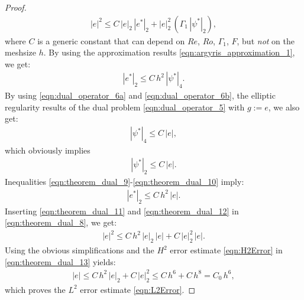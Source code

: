 \begin{proof}
\begin{eqnarray}
|e|^2
\leq C \, | e |_2 \, |e^* |_2
+ | e |_2^2 \, 
\left(
\Gamma_1 \, | \psi^* |_2
\right) ,
\label{eqn:theorem_dual_8}
\end{eqnarray}
where $C$ is a generic constant that can depend on $Re$, $Ro$, $\Gamma_1$, $F$, but \emph{not} on the meshsize $h$.
By using the approximation results \eqref{eqn:argyris_approximation_1}, we get:
\begin{eqnarray}
|e^* |_2
\leq C \, h^2 \, | \psi^* |_4 .
\label{eqn:theorem_dual_9}
\end{eqnarray}
By using \eqref{eqn:dual_operator_6a} and \eqref{eqn:dual_operator_6b}, the elliptic regularity results of the dual problem \eqref{eqn:dual_operator_5} with $g := e$, we also get:
\begin{eqnarray}
| \psi^* |_4
\leq C \, | e | ,
\label{eqn:theorem_dual_10}
\end{eqnarray}
which obviously implies
\begin{eqnarray}
| \psi^* |_2
\leq C \, | e | .
\label{eqn:theorem_dual_11}
\end{eqnarray}
Inequalities \eqref{eqn:theorem_dual_9}-\eqref{eqn:theorem_dual_10} imply:
\begin{eqnarray}
|e^* |_2
\leq C \, h^2 \, | e | .
\label{eqn:theorem_dual_12}
\end{eqnarray}
Inserting \eqref{eqn:theorem_dual_11} and \eqref{eqn:theorem_dual_12}  in \eqref{eqn:theorem_dual_8}, we get:
\begin{eqnarray}
|e|^2
\leq C \, h^2 \, | e |_2 \, | e |
+ C \, | e |_2^2 \, | e | .
\label{eqn:theorem_dual_13}
\end{eqnarray}
Using the obvious simplifications and the $H^2$ error estimate \eqref{eqn:H2Error} in \eqref{eqn:theorem_dual_13} yields:
\begin{eqnarray}
|e|
\leq C \, h^2 \, | e |_2
+ C \, | e |_2^2
\leq C \, h^6 + C \, h^8
= C_0 \, h^6 ,
\label{eqn:theorem_dual_14}
\end{eqnarray}
which proves the $L^2$ error estimate \eqref{eqn:L2Error}.



\end{proof}
